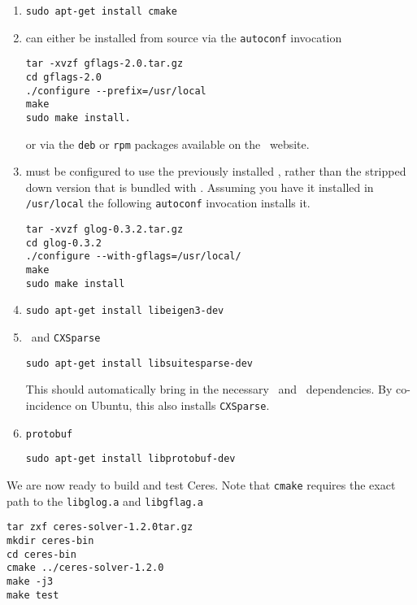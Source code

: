 \begin{enumerate}
\item{\cmake}
\begin{verbatim}
sudo apt-get install cmake
\end{verbatim}

\item{\gflags} can either be installed from source via the \texttt{autoconf} invocation
\begin{verbatim}
tar -xvzf gflags-2.0.tar.gz
cd gflags-2.0
./configure --prefix=/usr/local
make
sudo make install.
\end{verbatim}
or via the \texttt{deb} or \texttt{rpm} packages available on the \gflags\ website.

\item{\glog} must be configured to use the previously installed
\gflags, rather than the stripped down version that is bundled with \glog. Assuming you have it installed in \texttt{/usr/local} the following \texttt{autoconf} invocation installs it.
\begin{verbatim}
tar -xvzf glog-0.3.2.tar.gz
cd glog-0.3.2
./configure --with-gflags=/usr/local/
make
sudo make install
\end{verbatim}

\item{\eigen}
\begin{verbatim}
sudo apt-get install libeigen3-dev
\end{verbatim}

\item{\suitesparse\ and \texttt{CXSparse}}
\begin{verbatim}
sudo apt-get install libsuitesparse-dev
\end{verbatim}
This should automatically bring in the necessary \blas\ and \lapack\ dependencies. By co-incidence on Ubuntu, this also installs \texttt{CXSparse}.

\item{\texttt{protobuf}}
\begin{verbatim}
sudo apt-get install libprotobuf-dev
\end{verbatim}
\end{enumerate}


We are now ready to build and test Ceres. Note that \texttt{cmake} requires the exact path to the \texttt{libglog.a} and \texttt{libgflag.a}

\begin{verbatim}
tar zxf ceres-solver-1.2.0tar.gz
mkdir ceres-bin
cd ceres-bin
cmake ../ceres-solver-1.2.0
make -j3
make test
\end{verbatim}

